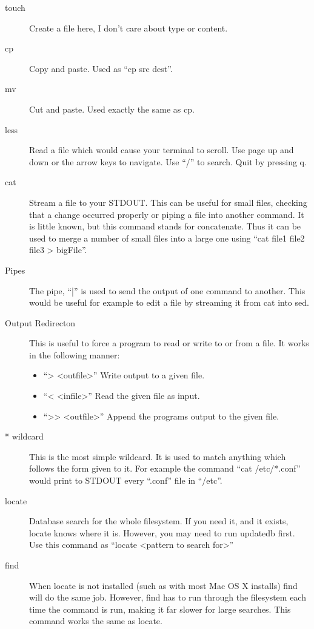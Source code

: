 \documentclass[a4paper,11pt]{report}
\begin{document}
\begin{description}
			\item[touch]
				Create a file here, I don't care about type or content. 
			\item[cp]
				Copy and paste. Used as ``cp src dest''.
			\item[mv]
				Cut and paste. Used exactly the same as cp. 
			\item[less]
				Read a file which would cause your terminal to scroll. 
				Use page up and down or the arrow keys to navigate. 
				Use ``/'' to search.
				Quit by pressing q.
			\item[cat]
				Stream a file to your STDOUT. 
				This can be useful for small files, checking that a change occurred properly or piping a file into another command. 
				It is little known, but this command stands for concatenate. 
				Thus it can be used to merge a number of small files into a large one using ``cat file1 file2 file3 > bigFile''.
			\item[Pipes]
				The pipe, ``|'' is used to send the output of one command to another. 
				This would be useful for example to edit a file by streaming it from cat into sed. 
			\item[Output Redirecton]
				This is useful to force a program to read or write to or from a file. 
				It works in the following manner:
				\begin{itemize}
					\item ``> <outfile>'' Write output to a given file.
					\item ``< <infile>'' Read the given file as input.
					\item ``>{}> <outfile>'' Append the programs output to the given file. 
				\end{itemize}
			\item[\** wildcard]
				This is the most simple wildcard. 
				It is used to match anything which follows the form given to it. 
				For example the command ``cat /etc/\**.conf'' would print to STDOUT every ``.conf'' file in ``/etc''.
			\item[locate]
				Database search for the whole filesystem. 
				If you need it, and it exists, locate knows where it is. 
				However, you may need to run updatedb first. 
				Use this command as ``locate <pattern to search for>''
			\item[find]
				When locate is not installed (such as with most Mac OS X installs) find will do the same job. 
				However, find has to run through the filesystem each time the command is run, making it far slower for large searches. 
				This command works the same as locate. 

\end{description}
\end{document}

